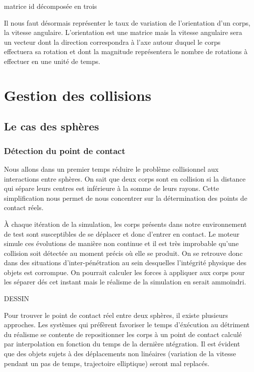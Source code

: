 \documentclass[twocolumn]{article}
\begin{document}
matrice id décomposée en trois

Il nous faut désormais représenter le taux de variation de l'orientation d'un corps, la vitesse angulaire. L'orientation est une matrice mais la vitesse angulaire sera un vecteur dont la direction correspondra à l'axe autour duquel le corps effectuera sa rotation et dont la magnitude représentera le nombre de rotations à effectuer en une unité de temps.


\section{Gestion des collisions}

\subsection{Le cas des sphères}

\subsubsection{Détection du point de contact}

Nous allons dans un premier temps réduire le problème collisionnel aux interactions entre sphères. On sait que deux corps sont en collision si la distance qui sépare leurs centres est inférieure à la somme de leurs rayons. Cette simplification nous permet de nous concentrer sur la détermination des points de contact réels. 

\`A chaque itération de la simulation, les corps présents dans notre environnement de test sont susceptibles de se déplacer et donc d'entrer en contact. Le moteur simule ces évolutions de manière non continue et il est très improbable qu'une collision soit détectée au moment précis o\`u elle se produit. On se retrouve donc dans des situations d'inter-pénétration au sein desquelles l'intégrité physique des objets est corrompue. On pourrait calculer les forces à appliquer aux corps pour les séparer dés cet instant mais le réalisme de la simulation en serait ammoindri.

DESSIN

Pour trouver le point de contact réel entre deux sphères, il existe plusieurs approches. Les systèmes qui préfèrent favoriser le temps d'éxécution au détriment du réalisme se contente de repositionner les corps à un point de contact calculé par interpolation en fonction du temps de la dernière ntégration. Il est évident que des objets sujets à des déplacements non linéaires (variation de la vitesse pendant un pas de temps, trajectoire elliptique) seront mal replacés.
\end{document}
